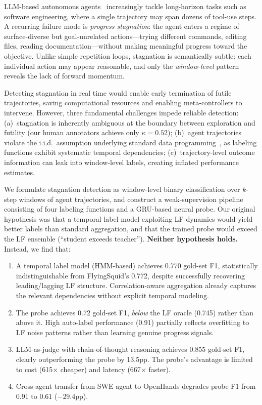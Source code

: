 \documentclass[11pt,a4paper]{article}
\begin{document}
LLM-based autonomous agents~\cite{yang2024swe,wang2024opendevin} increasingly tackle long-horizon tasks such as software engineering, where a single trajectory may span dozens of tool-use steps.
A recurring failure mode is \emph{progress stagnation}: the agent enters a regime of surface-diverse but goal-unrelated actions---trying different commands, editing files, reading documentation---without making meaningful progress toward the objective.
Unlike simple repetition loops, stagnation is semantically subtle: each individual action may appear reasonable, and only the \emph{window-level} pattern reveals the lack of forward momentum.

Detecting stagnation in real time would enable early termination of futile trajectories, saving computational resources and enabling meta-controllers to intervene.
However, three fundamental challenges impede reliable detection:
(a)~stagnation is inherently ambiguous at the boundary between exploration and futility (our human annotators achieve only $\kappa{=}0.52$);
(b)~agent trajectories violate the i.i.d.\ assumption underlying standard data programming~\cite{ratner2017snorkel}, as labeling functions exhibit systematic temporal dependencies;
(c)~trajectory-level outcome information can leak into window-level labels, creating inflated performance estimates.

We formulate stagnation detection as window-level binary classification over $k$-step windows of agent trajectories, and construct a weak-supervision pipeline consisting of four labeling functions and a GRU-based neural probe.
Our original hypothesis was that a temporal label model exploiting LF dynamics would yield better labels than standard aggregation, and that the trained probe would exceed the LF ensemble (``student exceeds teacher'').
\textbf{Neither hypothesis holds.}
Instead, we find that:

\begin{enumerate}
\item A temporal label model (HMM-based) achieves 0.770 gold-set F1, statistically indistinguishable from FlyingSquid's 0.772, despite successfully recovering leading/lagging LF structure. Correlation-aware aggregation already captures the relevant dependencies without explicit temporal modeling.
\item The probe achieves 0.72 gold-set F1, \emph{below} the LF oracle (0.745) rather than above it. High auto-label performance (0.91) partially reflects overfitting to LF noise patterns rather than learning genuine progress signals.
\item LLM-as-judge with chain-of-thought reasoning achieves 0.855 gold-set F1, clearly outperforming the probe by 13.5pp. The probe's advantage is limited to cost (615$\times$ cheaper) and latency (667$\times$ faster).
\item Cross-agent transfer from SWE-agent to OpenHands degrades probe F1 from 0.91 to 0.61 ($-$29.4pp).
\end{enumerate}
\end{document}
